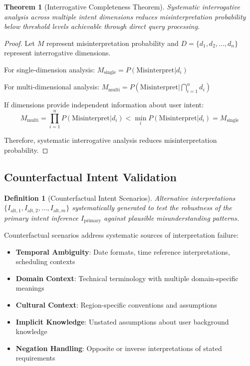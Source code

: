 \documentclass[12pt,a4paper]{article}
\newtheorem{theorem}{Theorem}
\newtheorem{definition}{Definition}
\begin{document}
\begin{theorem}[Interrogative Completeness Theorem]
Systematic interrogative analysis across multiple intent dimensions reduces misinterpretation probability below threshold levels achievable through direct query processing.
\end{theorem}

\begin{proof}
Let $M$ represent misinterpretation probability and $D = \{d_1, d_2, ..., d_n\}$ represent interrogative dimensions.

For single-dimension analysis: $M_{\text{single}} = P(\text{Misinterpret} | d_i)$

For multi-dimensional analysis: $M_{\text{multi}} = P(\text{Misinterpret} | \bigcap_{i=1}^{n} d_i)$

If dimensions provide independent information about user intent:
$$M_{\text{multi}} = \prod_{i=1}^{n} P(\text{Misinterpret} | d_i) < \min_i P(\text{Misinterpret} | d_i) = M_{\text{single}}$$

Therefore, systematic interrogative analysis reduces misinterpretation probability.
\end{proof}

\subsection{Counterfactual Intent Validation}

\begin{definition}[Counterfactual Intent Scenarios]
Alternative interpretations $\{I_{\text{alt},1}, I_{\text{alt},2}, ..., I_{\text{alt},m}\}$ systematically generated to test the robustness of the primary intent inference $I_{\text{primary}}$ against plausible misunderstanding patterns.
\end{definition}

Counterfactual scenarios address systematic sources of interpretation failure:

\begin{itemize}
\item \textbf{Temporal Ambiguity}: Date formats, time reference interpretations, scheduling contexts
\item \textbf{Domain Context}: Technical terminology with multiple domain-specific meanings  
\item \textbf{Cultural Context}: Region-specific conventions and assumptions
\item \textbf{Implicit Knowledge}: Unstated assumptions about user background knowledge
\item \textbf{Negation Handling}: Opposite or inverse interpretations of stated requirements
\end{itemize}
\end{document}
